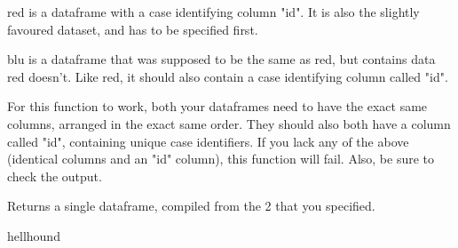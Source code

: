 \documentclass[letterpaper]{book}
\begin{document}
%
\begin{Arguments}
\begin{ldescription}
\item[\code{red}] 

red is a dataframe with a case identifying column "id". It is also the slightly favoured dataset, and has to be specified first. 

\item[\code{blu}] 

blu is a dataframe that was supposed to be the same as red, but contains data red doesn't. Like red, it should also contain a case identifying column called "id".

\end{ldescription}
\end{Arguments}
%
\begin{Details}\relax

For this function to work, both your dataframes need to have the exact same columns, arranged in the exact same order. They should also both have a column called "id", containing unique case identifiers. 
If you lack any of the above (identical columns and an "id" column), this function will fail. Also, be sure to check the output. 
\end{Details}
%
\begin{Value}





Returns a single dataframe, compiled from the 2 that you specified. 
\end{Value}
%
\begin{Author}\relax

hellhound
\end{Author}
%
\end{document}
